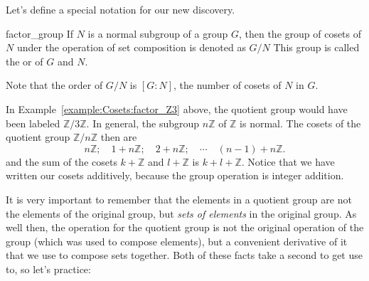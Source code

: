 Let's define a special notation for our new discovery.

\begin{defn}{factor_group} 
If $N$ is a normal subgroup of a group $G$, then the group of cosets of $N$ under the operation of set composition is denoted as $G/N$\label{notefactor} This group is called the   or  of $G$ and $N$. 
\end{defn} 
Note that the order of $G/N$ is $[G:N]$, the number of cosets of $N$ in $G$. 

 

\begin{rem}
In Example~\ref{example:Cosets:factor_Z3} above, the quotient  group would have been labeled ${\mathbb Z}/ 3 {\mathbb Z}$. In general, the subgroup $n {\mathbb Z}$ of ${\mathbb Z}$ is normal. The
cosets of the quotient  group ${\mathbb Z } / n {\mathbb Z}$ then are 
\[
n {\mathbb Z};\quad 1 + n {\mathbb Z}; \quad 2 + n {\mathbb Z}; \quad \cdots \quad
(n-1) + n {\mathbb Z}.
\]
and the sum of the cosets $k + {\mathbb Z}$ and $l + {\mathbb Z}$ is $k+l + 
{\mathbb Z}$. Notice that  we have written our cosets additively, 
because the group operation is integer addition. 
\end{rem}


It is very important to remember that the elements in a quotient group are not the elements of the original group, but \emph{sets of elements} in the original group. As well then, the operation for the quotient group is not the original operation of the group (which was used to compose elements), but a convenient derivative of it that we use to compose sets together.  Both of these facts take a second to get use to, so let's practice:

